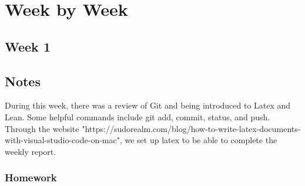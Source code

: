 \documentclass{article}
\theoremstyle{theorem}
\theoremstyle{definition}
\theoremstyle{remark}
\begin{document}




\section{Week by Week}\label{homework}

\subsection{Week 1}

\subsection*{Notes}

During this week, there was a review of Git and being introduced to Latex and Lean. Some helpful commands include git add, commit, status, and push. 
Through the website "https://sudorealm.com/blog/how-to-write-latex-documents-with-visual-studio-code-on-mac", we set up latex to be able to complete the weekly report.

\subsubsection*{Homework}
\end{document}
